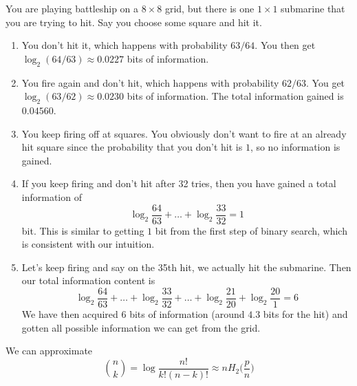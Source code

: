 \documentclass{article}
\begin{document}
    \begin{example}[Submarines]
      You are playing battleship on a $8 \times 8$ grid, but there is one $1 \times 1$ submarine that you are trying to hit. Say you choose some square and hit it. 
      \begin{enumerate}
        \item You don't hit it, which happens with probability $63/64$. You then get $\log_2 (64/63) \approx 0.0227$ bits of information. 

        \item You fire again and don't hit, which happens with probability $62/63$. You get $\log_2 (63/62) \approx 0.0230$ bits of information. The total information gained is $0.04560$. 

        \item You keep firing off at squares. You obviously don't want to fire at an already hit square since the probability that you don't hit is $1$, so no information is gained. 

        \item If you keep firing and don't hit after 32 tries, then you have gained a total information of 
        \begin{equation}
          \log_2 \frac{64}{63} + \ldots + \log_2 \frac{33}{32} = 1
        \end{equation}
        bit. This is similar to getting $1$ bit from the first step of binary search, which is consistent with our intuition. 

        \item Let's keep firing and say on the 35th hit, we actually hit the submarine. Then our total information content is 
        \begin{equation}
          \log_2 \frac{64}{63} + \ldots + \log_2 \frac{33}{32} + \ldots + \log_2 \frac{21}{20} + \log_2 \frac{20}{1} = 6
        \end{equation}
        We have then acquired 6 bits of information (around $4.3$ bits for the hit) and gotten all possible information we can get from the grid. 
      \end{enumerate}
    \end{example}

    \begin{lemma}
      We can approximate 
      \begin{equation}
        \binom{n}{k} = \log \frac{n!}{k! (n-k)!} \approx n H_2 \bigg( \frac{p}{n} \bigg)
      \end{equation}
    \end{lemma}
\end{document}

